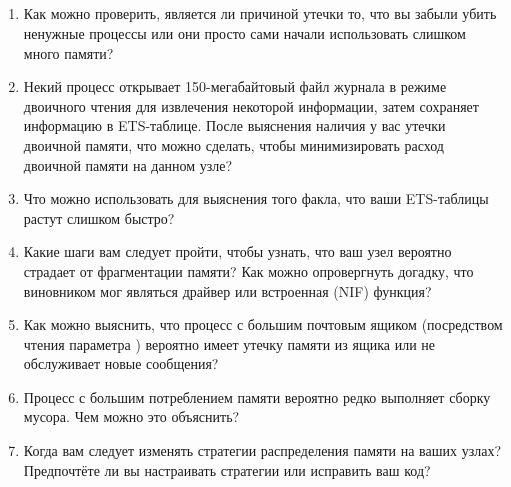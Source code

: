 \subsection*{\OpenEndedTitle{}}

\begin{enumerate}
	\item Как можно проверить, является ли причиной утечки то, что вы забыли убить ненужные процессы или они просто сами начали использовать слишком много памяти?
	\item Некий процесс открывает 150-мегабайтовый файл журнала в режиме двоичного чтения для извлечения некоторой информации, затем сохраняет информацию в ETS-таблице. После выяснения наличия у вас утечки двоичной памяти, что можно сделать, чтобы минимизировать расход двоичной памяти на данном узле?
	\item Что можно использовать для выяснения того факла, что ваши ETS-таблицы растут слишком быстро?
	\item Какие шаги вам следует пройти, чтобы узнать, что ваш узел вероятно страдает от фрагментации памяти? Как можно опровергнуть догадку, что виновником мог являться драйвер или встроенная (NIF) функция?
	\item Как можно выяснить, что процесс с большим почтовым ящиком (посредством чтения параметра ) вероятно имеет утечку памяти из ящика или не обслуживает новые сообщения?
	\item Процесс с большим потреблением памяти вероятно редко выполняет сборку мусора. Чем можно это объяснить?
	\item Когда вам следует изменять стратегии распределения памяти на ваших узлах? Предпочтёте ли вы настраивать стратегии или исправить ваш код?
\end{enumerate}


